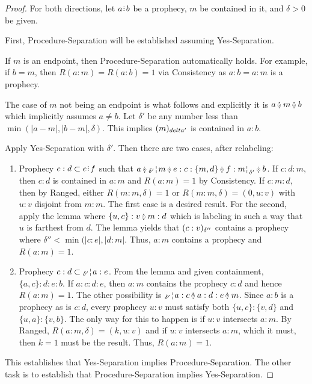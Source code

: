 \documentclass[12pt]{article}
\begin{document}
\begin{proof}
    For both directions, let $a \rint b$ be a prophecy, $m$ be contained in it, and $\delta >0 $ be given.

    First, Procedure-Separation will be established assuming Yes-Separation. 

     If $m$ is an endpoint, then Procedure-Separation automatically holds. For example, if $b=m$, then $R(a:m)=R(a:b) = 1$ via Consistency as  $a:b=a:m$ is a prophecy. 

     The case of $m$ not being an endpoint is what follows and explicitly it is $a \betneq m \betneq b$ which implicitly assumes $a \neq b$. Let $\delta'$ be any number less than $\min(|a-m|, |b-m|, \delta)$. This implies $\halo[delta']{m}$ is contained in $a:b$.
    
     Apply Yes-Separation with $\delta'$. Then there are two cases, after relabeling: 

    \begin{enumerate}
        \item Prophecy $c:d \subset e\rint f$ such that $a\betneq \fuzbleft[\delta']{m} \betneq e : c : \{m, d\} \betneq f : \fuzbright[\delta']{m} \betneq b$. If $c:d:m$, then $c:d$ is contained in $a:m$ and $R(a:m)=1$ by Consistency. If $c:m:d$, then by Ranged, either $R(m:m, \delta) = 1$ or $R(m:m, \delta) = (0, u:v)$ with $u:v$ disjoint from $m:m$. The first case is a desired result. For the second, apply the lemma where $\{u, c\}:v\betneq m :d$ which is labeling in such a way that $u$ is farthest from $d$. The lemma yields that $\halo[\delta'']{c:v}$ contains a prophecy where $\delta'' < \min(|c:e|, |d:m|$. Thus, $a:m$ contains a prophecy and $R(a:m)=1$.
        
        \item Prophecy $c:d \subset \fuzbleft[\delta']{a}:e$. From the lemma and given containment, $\{a,c\}:d:e:b$. If $a:c:d:e$, then $a:m$ contains the prophecy $c:d$ and hence $R(a:m)=1$. The other possibility is $\fuzbleft[\delta']{a} :c  \betneq a:d:e \betneq m$. Since $a:b$ is a prophecy as is $c:d$, every prophecy $u:v$ must satisfy both $\{u, c\}:\{v, d\}$ and $\{u, a\}:\{v, b\}$. The only way for this to happen is if $u:v$ intersects $a:m$. By Ranged,  $R(a:m, \delta) = (k, u:v)$ and if $u:v$ intersects $a:m$, which it must, then $k = 1$ must be the result. Thus, $R(a:m)=1$. 
    \end{enumerate}

    This establishes that Yes-Separation implies Procedure-Separation. The other task is to establish that Procedure-Separation implies Yes-Separation.


\end{proof}
\end{document}
